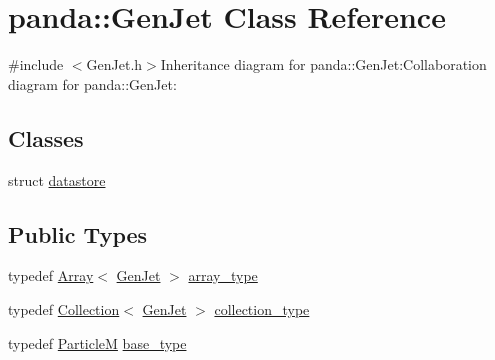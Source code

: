 \hypertarget{classpanda_1_1GenJet}{
\section{panda::GenJet Class Reference}
\label{classpanda_1_1GenJet}
}


{\ttfamily \#include $<$GenJet.h$>$}Inheritance diagram for panda::GenJet:Collaboration diagram for panda::GenJet:\subsection*{Classes}
\begin{DoxyCompactItemize}
\item 
struct \hyperlink{structpanda_1_1GenJet_1_1datastore}{datastore}
\end{DoxyCompactItemize}
\subsection*{Public Types}
\begin{DoxyCompactItemize}
\item 
typedef \hyperlink{classpanda_1_1Array}{Array}$<$ \hyperlink{classpanda_1_1GenJet}{GenJet} $>$ \hyperlink{classpanda_1_1GenJet_a732a43640504ffa4b44865f9eb422f74}{array\_\-type}
\item 
typedef \hyperlink{classpanda_1_1Collection}{Collection}$<$ \hyperlink{classpanda_1_1GenJet}{GenJet} $>$ \hyperlink{classpanda_1_1GenJet_adf2446e9cb42ccd9a7b2e790d674965a}{collection\_\-type}
\item 
typedef \hyperlink{classpanda_1_1ParticleM}{ParticleM} \hyperlink{classpanda_1_1GenJet_acec2fc5754d9d9da9805cbdaff566ee4}{base\_\-type}
\end{DoxyCompactItemize}
